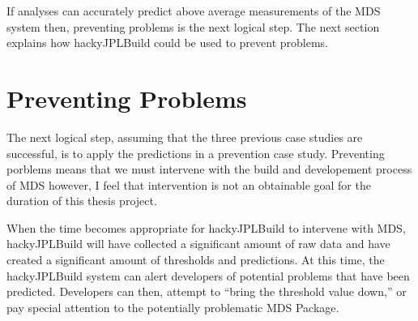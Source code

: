 If analyses can accurately predict above average measurements of the MDS
system then, preventing problems is the next logical step.  The next
section explains how hackyJPLBuild could be used to prevent problems.


\section{Preventing Problems}
The next logical step, assuming that the three previous case studies are
successful, is to apply the predictions in a prevention case study.
Preventing porblems means that we must intervene with the build and
developement process of MDS however, I feel that intervention is not an
obtainable goal for the duration of this thesis project.

When the time becomes appropriate for hackyJPLBuild to intervene with MDS,
hackyJPLBuild will have collected a significant amount of raw data and have 
created a significant amount of thresholds and predictions.  At this time,
the hackyJPLBuild system can alert developers of potential problems that
have been predicted.  Developers can then, attempt to ``bring the threshold 
value down,'' or pay special attention to the potentially problematic MDS
Package.














